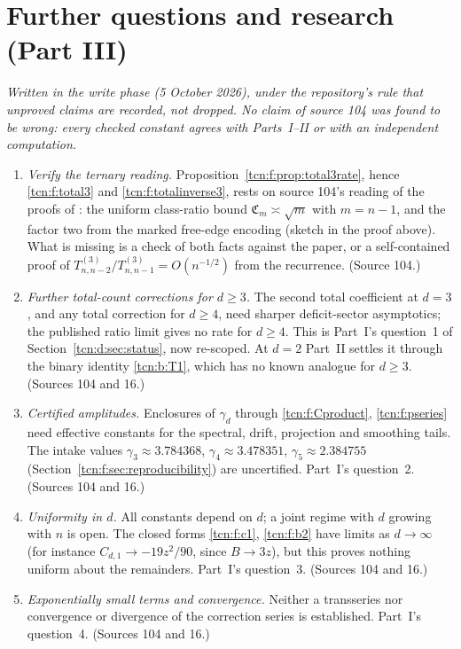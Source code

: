 \documentclass[11pt,letterpaper]{article}
\theoremstyle{remark}
\begin{document}
\section{Further questions and research (Part III)}\label{tcn:f:sec:questions}
\emph{Written in the write phase (5 October 2026), under the repository's rule that unproved claims are recorded, not dropped. No claim of source 104 was found to be wrong: every checked constant agrees with Parts~I--II or with an independent computation.}
\begin{enumerate}[itemsep=2pt]
\item \emph{Verify the ternary reading.} Proposition~\ref{tcn:f:prop:total3rate}, hence \eqref{tcn:f:total3} and \eqref{tcn:f:totalinverse3}, rests on source 104's reading of the proofs of \cite[Lemma 3.24 and Theorem 1.9(ii)]{Chang2024}: the uniform class-ratio bound $\mathfrak C_m\asymp\sqrt m$ with $m=n-1$, and the factor two from the marked free-edge encoding (sketch in the proof above). What is missing is a check of both facts against the paper, or a self-contained proof of $T^{(3)}_{n,n-2}/T^{(3)}_{n,n-1}=O(n^{-1/2})$ from the recurrence. (Source 104.)
\item \emph{Further total-count corrections for $d\ge3$.} The second total coefficient at $d=3$, and any total correction for $d\ge4$, need sharper deficit-sector asymptotics; the published ratio limit gives no rate for $d\ge4$. This is Part~I's question~1 of Section~\ref{tcn:d:sec:status}, now re-scoped. At $d=2$ Part~II settles it through the binary identity \eqref{tcn:b:T1}, which has no known analogue for $d\ge3$. (Sources 104 and 16.)
\item \emph{Certified amplitudes.} Enclosures of $\gamma_d$ through \eqref{tcn:f:Cproduct}, \eqref{tcn:f:pseries} need effective constants for the spectral, drift, projection and smoothing tails. The intake values $\gamma_3\approx3.784368$, $\gamma_4\approx3.478351$, $\gamma_5\approx2.384755$ (Section~\ref{tcn:f:sec:reproducibility}) are uncertified. Part~I's question~2. (Sources 104 and 16.)
\item \emph{Uniformity in $d$.} All constants depend on $d$; a joint regime with $d$ growing with $n$ is open. The closed forms \eqref{tcn:f:c1}, \eqref{tcn:f:b2} have limits as $d\to\infty$ (for instance $C_{d,1}\to-19z^2/90$, since $B\to3z$), but this proves nothing uniform about the remainders. Part~I's question~3. (Sources 104 and 16.)
\item \emph{Exponentially small terms and convergence.} Neither a transseries nor convergence or divergence of the correction series is established. Part~I's question~4. (Sources 104 and 16.)

\end{enumerate}
\end{document}
